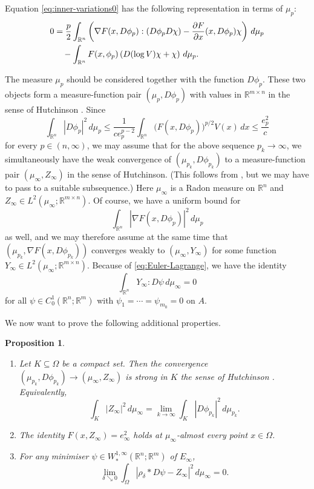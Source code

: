 \documentclass[a4paper]{article}
\newcommand{\R}{\mathbb{R}}
\newcommand{\grad}{\nabla}
\let\div\relax\DeclareMathOperator{\div}{div}
\newcommand{\dd}[2]{\frac{\partial #1}{\partial #2}}
\newtheorem{proposition}[theorem]{Proposition}
\theoremstyle{definition}
\theoremstyle{remark}
\begin{document}
Equation \eqref{eq:inner-variations0} has the following representation
in terms of $\mu_p$:
\begin{equation} \label{eq:inner-variation}
\begin{split}
0 & = \frac{p}{2} \int_{\R^n} \left(\grad F(x, D\phi_p) : (D\phi_p D\chi) - \dd{F}{x}(x, D\phi_p) \chi\right) \, d\mu_p \\
& \quad - \int_{\R^n} F(x, \phi_p) \left(D(\log V) \chi + \div \chi\right) \, d\mu_p.
\end{split}
\end{equation}

The measure $\mu_p$ should be considered together with the function
$D\phi_p$. These two objects form a measure-function pair $(\mu_p, D\phi_p)$
with values in $\R^{m \times n}$ in the sense of Hutchinson \cite{Hutchinson:86}.
Since
\[
\int_{\R^n} |D\phi_p|^2 \, d\mu_p \le \frac{1}{c e_p^{p - 2}} \int_{\R^n} \bigl(F(x, D\phi_p)\bigr)^{p/2} V(x) \, dx \le \frac{e_p^2}{c}
\]
for every $p \in (n, \infty)$, we may assume that for the above sequence
$p_k \to \infty$, we simultaneously have the weak convergence of
$(\mu_{p_k}, D\phi_{p_k})$ to a measure-function pair $(\mu_\infty, Z_\infty)$
in the sense of Hutchinson. (This follows from \cite[Theorem 4.4.2]{Hutchinson:86}, but we may have to pass to a suitable subsequence.)
Here $\mu_\infty$ is a Radon measure on $\R^n$ and
$Z_\infty \in L^2(\mu_\infty; \R^{m \times n})$. Of course, we have a
uniform bound for
\[
\int_{\R^n} |\grad F(x, D\phi_p)|^2 \, d\mu_p
\]
as well, and we may therefore assume at the same time that
$(\mu_{p_k}, \grad F(x, D\phi_{p_k}))$ converges weakly to $(\mu_\infty, Y_\infty)$
for some function $Y_\infty \in L^2(\mu_\infty; \R^{m \times n})$.
Because of \eqref{eq:Euler-Lagrange}, we have the identity
\begin{equation} \label{eq:Euler-Lagrange-limit}
\int_{\R^n} Y_\infty : D\psi \, d\mu_\infty =0
\end{equation}
for all $\psi \in C_0^1(\R^n; \R^m)$ with $\psi_1 = \dotsb = \psi_{m_0} = 0$ on $A$.

We now want to prove the following additional properties.

\begin{proposition} \label{prp:measure-function}
\begin{enumerate}
\item \label{itm:strong-convergence}
Let $K \subseteq \Omega$ be a compact set. Then the convergence $(\mu_{p_k}, D\phi_{p_k}) \to (\mu_\infty, Z_\infty)$ is
strong in $K$ the sense of Hutchinson \cite{Hutchinson:86}. Equivalently,
\[
\int_K |Z_\infty|^2 \, d\mu_\infty = \lim_{k \to \infty} \int_K |D\phi_{p_k}|^2 \, d\mu_{p_k}.
\]
\item \label{itm:pointwise}
The identity $F(x, Z_\infty) = e_\infty^2$ holds at $\mu_\infty$-almost
every point $x \in \Omega$.
\item \label{itm:gradient-of-minimiser}
For any minimiser $\psi \in W_*^{1, \infty}(\R^n; \R^m)$ of $E_\infty$,
\[
\lim_{\delta \searrow 0} \int_\Omega |\rho_\delta * D\psi - Z_\infty|^2 \, d\mu_\infty = 0.
\]
\end{enumerate}
\end{proposition}
\end{document}
